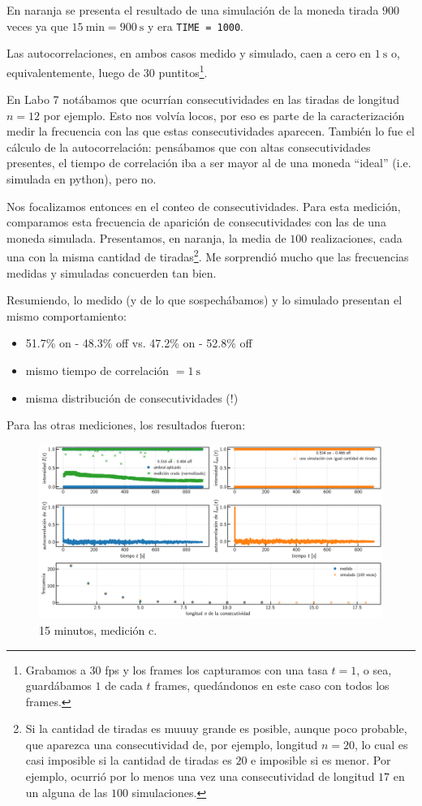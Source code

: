 \documentclass[a4paper]{article}
\begin{document}
En naranja se presenta el resultado de una simulación de la moneda tirada $900$ veces ya que $\SI{15}{\minute} = \SI{900}{\second}$ y era \texttt{TIME = 1000}.

Las autocorrelaciones, en ambos casos medido y simulado, caen a cero en $\SI{1}{\second}$ o, equivalentemente, luego de $30$ puntitos\footnote{Grabamos a $30$ fps y los frames los capturamos con una tasa $t = 1$, o sea, guardábamos $1$ de cada $t$ frames, quedándonos en este caso con todos los frames.}.

En Labo 7 notábamos que ocurrían consecutividades en las tiradas de longitud $n=12$ por ejemplo.
Esto nos volvía locos, por eso es parte de la caracterización medir la frecuencia con las que estas consecutividades aparecen.
También lo fue el cálculo de la autocorrelación: pensábamos que con altas consecutividades presentes, el tiempo de correlación iba a ser mayor al de una moneda ``ideal'' (i.e. simulada en python), pero no.

Nos focalizamos entonces en el conteo de consecutividades.
Para esta medición, comparamos esta frecuencia de aparición de consecutividades con las de una moneda simulada.
Presentamos, en naranja, la media de $100$ realizaciones, cada una con la misma cantidad de tiradas\footnote{Si la cantidad de tiradas es muuuy grande es posible, aunque poco probable, que aparezca una consecutividad de, por ejemplo, longitud $n=20$, lo cual es casi imposible si la cantidad de tiradas es $20$ e imposible si es menor. Por ejemplo, ocurrió por lo menos una vez una consecutividad de longitud $17$ en un alguna de las $100$ simulaciones.}.
Me sorprendió mucho que las frecuencias medidas y simuladas concuerden tan bien. 

Resumiendo, lo medido (y de lo que sospechábamos) y lo simulado presentan el mismo comportamiento:
\begin{itemize}
	\item 51.7\% on - 48.3\% off vs. 47.2\% on - 52.8\% off
	\item mismo tiempo de correlación $= \SI{1}{\second}$
	\item misma distribución de consecutividades (!)
\end{itemize}

Para las otras mediciones, los resultados fueron:

\begin{figure}[!h]
	\centering
	\includegraphics[width=\linewidth]{Resultados/15min_c.png}
	\caption{15 minutos, medición c.}
\end{figure}
\end{document}
